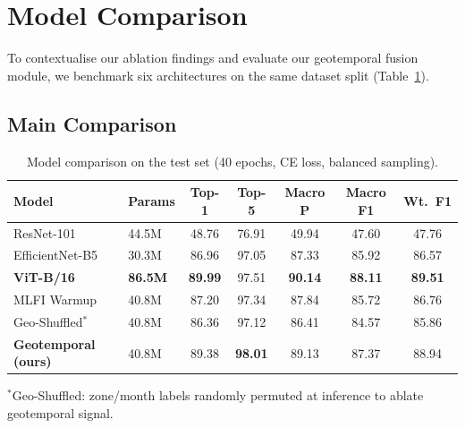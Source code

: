 \documentclass[runningheads]{llncs}
\begin{document}
\section{Model Comparison}
To contextualise our ablation findings and evaluate our geotemporal fusion module, we benchmark six architectures on the same dataset split (Table~\ref{tab:model_comparison}).
\subsection{Main Comparison}
\begin{table}[H]
\centering
\caption{Model comparison on the test set (40 epochs, CE loss, balanced sampling).}
\label{tab:model_comparison}
\small
\begin{tabular}{@{}llccccc@{}}
\toprule
\textbf{Model} & \textbf{Params} & \textbf{Top-1} & \textbf{Top-5} & \textbf{Macro P} & \textbf{Macro F1} & \textbf{Wt.\ F1} \\
\midrule
ResNet-101 & 44.5M & 48.76 & 76.91 & 49.94 & 47.60 & 47.76 \\
EfficientNet-B5 & 30.3M & 86.96 & 97.05 & 87.33 & 85.92 & 86.57 \\
\textbf{ViT-B/16} & \textbf{86.5M} & \textbf{89.99} & 97.51 & \textbf{90.14} & \textbf{88.11} & \textbf{89.51} \\
MLFI Warmup & 40.8M & 87.20 & 97.34 & 87.84 & 85.72 & 86.76 \\
Geo-Shuffled$^*$ & 40.8M & 86.36 & 97.12 & 86.41 & 84.57 & 85.86 \\
\textbf{Geotemporal (ours)} & 40.8M & 89.38 & \textbf{98.01} & 89.13 & 87.37 & 88.94 \\
\bottomrule
\end{tabular}
\raggedright\scriptsize{$^*$Geo-Shuffled: zone/month labels randomly permuted at inference to ablate geotemporal signal.}
\end{table}
\newpage
\end{document}
